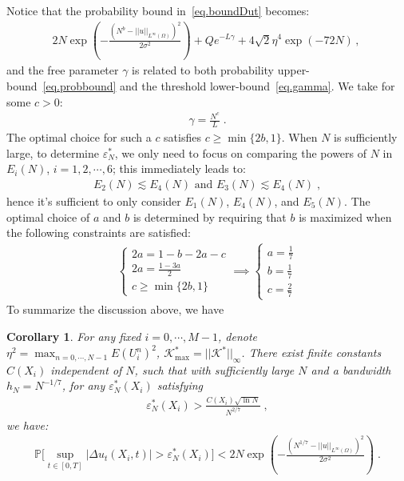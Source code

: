 \documentclass[a4paper,11pt]{article}
\newtheorem{corollary}{Corollary}[section]
\begin{document}
Notice that the probability bound in~\eqref{eq.boundDut} becomes:
\begin{align}
2N \exp(-\frac{(N^b-||u||_{L^\infty(\Omega)})^2}{2\sigma^2})+Qe^{-L\gamma}+4\sqrt{2}\eta^4\exp(-72N)\,,~\label{eq.probbound}
\end{align}
and the free parameter $\gamma$ is related to both probability upper-bound~\eqref{eq.probbound} and the threshold lower-bound~\eqref{eq.gamma}. We take for some $c>0$:
\begin{align}
\gamma = \frac{N^c}{L}\;.
\end{align}
The optimal choice for such a $c$ satisfies $c\geq \min\{2b,1\}$. When $N$ is sufficiently large, to determine $\varepsilon_N^*$, we only need to focus on comparing the powers of $N$ in $E_i(N)$, $i=1,2,\cdots,6$; this immediately leads to:
\begin{align}
E_2(N)\lesssim E_4(N) \text{~and~} E_3(N)\lesssim E_4(N)	\;,
\end{align}
hence it's sufficient to only consider $E_1(N)$, $E_4(N)$, and $E_5(N)$. The optimal choice of $a$ and $b$ is determined by requiring that $b$ is maximized when the following constraints are satisfied:
\begin{align}
\begin{cases}
	2a = 1-b-2a-c\\
	2a = \frac{1-3a}{2}\\
	c\geq \min\{2b,1\}
\end{cases}	\implies\begin{cases}
a= \frac{1}{7}\\
b = \frac{1}{7}\\
c = \frac{2}{7}	
\end{cases}\label{eq.parchoice}
\end{align}
To summarize the discussion above, we have
\begin{corollary}
For any fixed $i=0,\cdots,M-1$, denote $\eta^2 = \max_{n=0,\cdots,N-1}E(U_i^n)^2$, $\mathcal{K}^*_{\max}=||\mathcal{K}^*||_\infty$. There exist finite constants $C(X_i)$ independent of $N$, such that with sufficiently large $N$ and a bandwidth $h_N = N^{-1/7}$, for any $\varepsilon_N^*(X_i)$ satisfying
\begin{align*}
\varepsilon_N^*(X_i)> \frac{C(X_i)\sqrt{\ln N}}{N^{2/7}}\;,
\end{align*}
we have:
\begin{align}
\mathbb{P}\Big[\sup_{t\in[0,T]}|\Delta u_t(X_i,t)|>\varepsilon_N^*(X_i)\Big]<2N \exp(-\frac{(N^{1/7}-||u||_{L^\infty(\Omega)})^2}{2\sigma^2})\;.\label{eq.SimpleboundDut}
\end{align}
\end{corollary}
\end{document}
